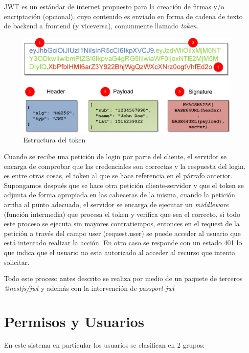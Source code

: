 JWT es un estándar de internet propuesto para la creación de firmas y/o encriptación (opcional), cuyo contenido es enviado en forma de cadena de texto de backend a frontend (y viceversa), comunmente llamado \textit{token}.

\begin{figure}[h!]
	\centering
	\includegraphics[width=0.95\linewidth]{images/Chapter 3/jwt1}
	\caption{Estructura del token \cite{jwt_image}}
	\label{fig:jwt}
\end{figure}

Cuando se recibe una petición de login por parte del cliente, el servidor se encarga de comprobar que las credenciales son correctas y la respuesta del login, es entre otras cosas, el token al que se hace referencia en el párrafo anterior. Supongamos después que se hace otra petición cliente-servidor y que el token se adjunta de forma apropiada en las cabeceras de la misma, cuando la petición arriba al punto adecuado, el servidor se encarga de ejecutar un \textit{middleware} (función intermedia) que procesa el token y verifica que sea el correcto, si todo este proceso se ejecuta sin mayores contratiempos, entonces en el request de la petición a través del campo user (request.user) se puede acceder al usuario que está intentado realizar la acción. En otro caso se responde con un estado 401 lo que indica que el usuario no esta autorizado al acceder al recurso que intenta solicitar. 

Todo este proceso antes descrito se realiza por medio de un paquete de terceros \textit{@nestjs/jwt} y además con la intervención de \textit{passport-jwt}



\section{Permisos y Usuarios}

En este sistema en particular los usuarios se clasifican en 2 grupos:

